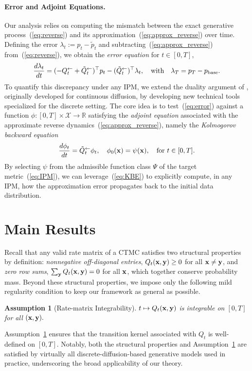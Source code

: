\documentclass{article} %
\newtheorem{assumption}{Assumption}
\def\eqref#1{equation~\ref{#1}}
\newcommand{\bfx}{{\bf x}}
\newcommand{\bfy}{ {\bf y}}
\renewcommand{\eqref}[1]{\textup{(\ref{#1})}}
\begin{document}
\paragraph{Error and Adjoint Equations.} Our analysis relies on computing the mismatch between the exact generative process~\eqref{eq:reverse} and its approximation~\eqref{eq:approx_reverse} over time. Defining the error $\lambda_t:=p_t-\tilde{p}_t$ and subtracting~\eqref{eq:approx_reverse} from~\eqref{eq:reverse}, we obtain the \emph{error equation} for $t \in [0, T]$,
\newcommand{\erroreq}{\frac{d\lambda_{t}}{dt}
    = (-Q_{t}^{\leftarrow} + \tilde{Q}_{t}^{\leftarrow})^\top p_{t} - (\tilde{Q}_{t}^{\leftarrow})^\top \lambda_{t}, \quad \text{with}\quad \lambda_T = p_T-p_{\rm base}.}
\begin{equation}\label{eq:error}
    \erroreq
\end{equation}
To quantify this discrepancy under any IPM, we extend the duality argument of \citet[Section~4.1]{mimikos2024score}, originally developed for continuous diffusion, by developing new technical tools specialized for the discrete setting. The core idea is to test~\eqref{eq:error} against a function $\phi:[0, T] \times \mathcal{X} \to \mathbb{R}$ satisfying the \emph{adjoint equation} associated with the approximate reverse dynamics~\eqref{eq:approx_reverse}, namely the \emph{Kolmogorov backward equation}
\newcommand{\KBEeq}{\frac{d\phi_t}{dt}=\tilde{Q}_{t}^{\leftarrow} \phi_t, \quad \phi_0(\bfx)=\psi(\bfx), \quad \text{for } t \in [0, T].}
\begin{equation}\label{eq:KBE}
    \KBEeq
\end{equation}
By selecting $\psi$ from the admissible function class $\Psi$ of the target metric~\eqref{eq:IPM}, we can leverage~\eqref{eq:KBE} to explicitly compute, in any IPM, how the approximation error propagates back to the initial data distribution.



\section{Main Results}\label{sec:result}
Recall that any valid rate matrix of a CTMC satisfies 
two structural properties by definition: \emph{nonnegative off-diagonal entries}, $Q_t(\bfx,\bfy) \ge 0$ for all $\bfx \ne \bfy$, and \emph{zero row sums}, $\sum_\bfy Q_t(\bfx,\bfy) = 0$ for all $\bfx$, which together conserve probability mass. Beyond these structural properties, we impose only the following mild regularity condition to keep our framework as general as possible.
\begin{assumption}[Rate-matrix Integrability]
\label{ass:rate}
$t \mapsto Q_t(\bfx,\bfy)$ is integrable on $[0,T]$ for all $(\bfx,\bfy).$
\end{assumption}
Assumption~\ref{ass:rate} ensures that the transition kernel associated with $Q_t$ is well-defined on $[0,T]$. Notably, both the structural properties and Assumption~\ref{ass:rate} are satisfied by virtually all discrete-diffusion-based generative models used in practice, underscoring the broad applicability of our theory.
\end{document}
